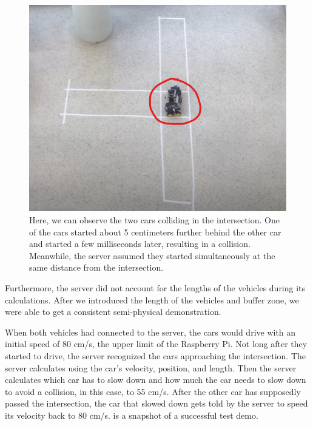 \begin{figure}[h!]
	\centering
	\includegraphics[width=1\linewidth]{figures/demo_crash}
	\caption{Here, we can observe the two cars colliding in the intersection. One of the cars started about 5 centimeters further behind the other car and started a few milliseconds later, resulting in a collision. Meanwhile, the server assumed they started simultaneously at the same distance from the intersection.}
	\label{fig:crashdemo}
\end{figure}

Furthermore, the server did not account for the lengths of the vehicles during its calculations. After we introduced the length of the vehicles and buffer zone, we were able to get a consistent semi-physical demonstration.

When both vehicles had connected to the server, the cars would drive with an initial speed of 80 cm/s, the upper limit of the Raspberry Pi. Not long after they started to drive, the server recognized the cars approaching the intersection. The server calculates using the car's velocity, position, and length. Then the server calculates which car has to slow down and how much the car needs to slow down to avoid a collision, in this case, to 55 cm/s. After the other car has supposedly passed the intersection, the car that slowed down gets told by the server to speed its velocity back to 80 cm/s.  is a snapshot of a successful test demo.

